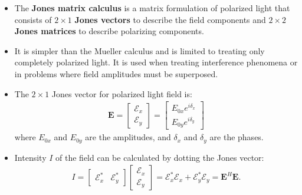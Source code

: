 \documentclass[10pt]{article}
\newcommand{\ve}[1]{\mathbf{#1}}
\begin{document}
	\begin{itemize}
		\item  The \textbf{Jones matrix calculus} is a matrix formulation of polarized light that consists of $2\times 1$ \textbf{Jones vectors} to describe the field components and $2 \times 2$ \textbf{Jones matrices} to describe polarizing components.

		\item It is simpler than the Mueller calculus and is limited to treating only completely polarized light.  It is used when treating interference phenomena or in problems where field amplitudes must be superposed.

		\item The $2 \times 1$ Jones vector for polarized light field is:
		\begin{align*}
			\ve{E} = \begin{bmatrix}
				\mathcal{E}_x \\ \mathcal{E}_y
			\end{bmatrix}
			= \begin{bmatrix}
				E_{0x} e^{i\delta_x} \\
				E_{0y} e^{i\delta_y}
			\end{bmatrix}
		\end{align*}
		where $E_{0x}$ and $E_{0y}$ are the amplitudes, and $\delta_x$ and $\delta_y$ are the phases.

		\item Intensity $I$ of the field can be calculated by dotting the Jones vector:
		\begin{align*}
			I = \begin{bmatrix}
				\mathcal{E}_x^* & \mathcal{E}_y^*
			\end{bmatrix}
			\begin{bmatrix}
				\mathcal{E}_x \\
				\mathcal{E}_y
			\end{bmatrix}
			= \mathcal{E}_x^* \mathcal{E}_x + \mathcal{E}^*_y \mathcal{E}_y
			= \mathbf{E}^H \mathbf{E}.
		\end{align*}


\end{itemize}
\end{document}

